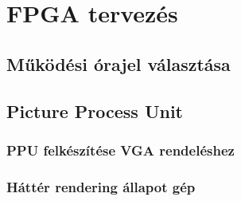 \chapter{FPGA tervezés}

\section{Működési órajel választása}

\section{Picture Process Unit}
\label{sec:PPU-FPGA}

	\subsection{PPU felkészítése VGA rendeléshez}

	\subsection{Háttér rendering állapot gép}
	
